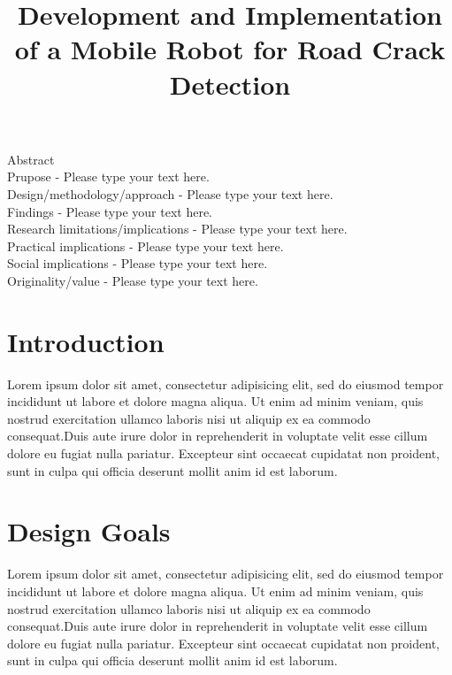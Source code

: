 \documentclass[twocolumn]{article}
\title{Development and Implementation of a Mobile Robot for Road Crack Detection}
\begin{document}
\maketitle
    \begin{strip}
        Abstract\\
        Prupose - Please type your text here.\\
        Design/methodology/approach - Please type your text here.\\
        Findings - Please type your text here.\\
        Research limitations/implications - Please type your text here.\\
        Practical implications - Please type your text here.\\
        Social implications - Please type your text here.\\
        Originality/value - Please type your text here.\\
    \end{strip}
    
    \section{Introduction}
        Lorem ipsum dolor sit amet, consectetur adipisicing elit, sed do eiusmod
        tempor incididunt ut labore et dolore magna aliqua. Ut enim ad minim veniam,
        quis nostrud exercitation ullamco laboris nisi ut aliquip ex ea commodo
        consequat.Duis aute irure dolor in reprehenderit in voluptate velit esse
        cillum dolore eu fugiat nulla pariatur. Excepteur sint occaecat cupidatat non
        proident, \cite{GraffZivin2018} sunt in culpa qui officia deserunt mollit anim id est laborum.

    \section{Design Goals}
        Lorem ipsum dolor sit amet, consectetur adipisicing elit, sed do eiusmod
        tempor incididunt ut labore et dolore magna aliqua. Ut enim ad minim veniam,
        quis nostrud exercitation ullamco laboris nisi ut aliquip ex ea commodo
        consequat.Duis aute irure dolor in reprehenderit in voluptate velit esse
        cillum dolore eu fugiat nulla pariatur. Excepteur sint occaecat cupidatat non
        proident, sunt in culpa qui officia deserunt mollit anim id est laborum.
    
\end{document}
